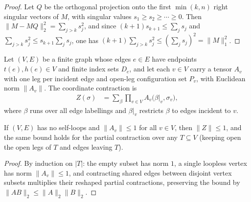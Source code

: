\begin{proof}\leanok
    Let $Q$ be the orthogonal projection onto the first $\min(k,n)$ right
    singular vectors of $M$, with singular values $s_1\ge s_2\ge\cdots\ge0$.
    Then $\lVert M-MQ\rVert_2^2=\sum_{j>k}s_j^2$, and since
    $(k+1)s_{k+1}\le\sum_j s_j$ and $\sum_{j>k}s_j^2\le s_{k+1}\sum_j s_j$,
    one has $(k+1)\sum_{j>k}s_j^2\le(\sum_j s_j)^2=\lVert M\rVert_1^2$.
\end{proof}

\begin{definition}
    \label{def:peps_group_contraction}
    \leanok
    Let $(V,E)$ be a finite graph whose edges $e\in E$ have endpoints
    $t(e),h(e)\in V$ and finite index sets $D_e$, and let each $v\in V$ carry
    a tensor $A_v$ with one leg per incident edge and open-leg configuration
    set $P_v$, with Euclidean norm $\lVert A_v\rVert$. The coordinate
    contraction is
    \begin{align}
        Z(\sigma) & =\sum_{\beta}\prod_{v\in V}A_v\bigl(\beta|_{v},\sigma_v\bigr),
        \label{eq:peps_group_contraction}
    \end{align}
    where $\beta$ runs over all edge labellings and $\beta|_v$ restricts
    $\beta$ to edges incident to $v$.
\end{definition}

\begin{lemma}
    \label{thm:peps_group_contraction_norm}
    \leanok
    If $(V,E)$ has no self-loops and $\lVert A_v\rVert\le1$ for all $v\in V$,
    then $\lVert Z\rVert\le1$, and the same bound holds for the partial
    contraction over any $T\subseteq V$ (keeping open the open legs of $T$ and
    edges leaving $T$).
\end{lemma}

\begin{proof}\leanok
    By induction on $|T|$: the empty subset has norm $1$, a single loopless
    vertex has norm $\lVert A_v\rVert\le1$, and contracting shared edges
    between disjoint vertex subsets multiplies their reshaped partial
    contractions, preserving the bound by
    $\lVert AB\rVert_2\le\lVert A\rVert_2\lVert B\rVert_2$.
\end{proof}

